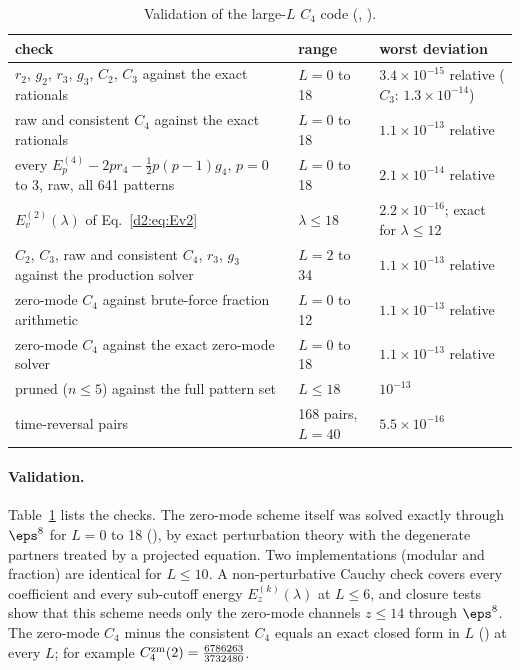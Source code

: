 \begin{table}[ht]
\centering\footnotesize\renewcommand{\arraystretch}{1.15}
\begin{tabular}{@{}p{8.6cm}p{2.2cm}p{3.7cm}@{}}
\toprule
check & range & worst deviation \\\midrule
$r_2$, $g_2$, $r_3$, $g_3$, $C_2$, $C_3$ against the exact rationals & $L=0$ to 18 & $3.4\times10^{-15}$ relative ($C_3$: $1.3\times10^{-14}$) \\
raw and consistent $C_4$ against the exact rationals & $L=0$ to 18 & $1.1\times10^{-13}$ relative \\
every $E_p^{(4)}-2pr_4-\frac12p(p-1)g_4$, $p=0$ to 3, raw, all 641 patterns & $L=0$ to 18 & $2.1\times10^{-14}$ relative \\
$E_v^{(2)}(\lambda)$ of Eq.~\eqref{d2:eq:Ev2} & $\lambda\le18$ & $2.2\times10^{-16}$; exact for $\lambda\le12$ \\
$C_2$, $C_3$, raw and consistent $C_4$, $r_3$, $g_3$ against the production solver & $L=2$ to 34 & $1.1\times10^{-13}$ relative \\
zero-mode $C_4$ against brute-force fraction arithmetic & $L=0$ to 12 & $1.1\times10^{-13}$ relative \\
zero-mode $C_4$ against the exact zero-mode solver & $L=0$ to 18 & $1.1\times10^{-13}$ relative \\
pruned ($n\le5$) against the full pattern set & $L\le18$ & $10^{-13}$ \\
time-reversal pairs & 168 pairs, $L=40$ & $5.5\times10^{-16}$ \\
\bottomrule
\end{tabular}
\caption{Validation of the large-$L$ $C_4$ code (, ).}
\label{d2:tab:c4valid}
\end{table}

\paragraph{Validation.} Table~\ref{d2:tab:c4valid} lists the checks. The zero-mode scheme itself was solved exactly through
$\eps^8$ for $L=0$ to 18 (), by exact perturbation theory with the degenerate partners treated by
a projected equation. Two implementations (modular and fraction) are identical for $L\le10$. A non-perturbative Cauchy
check covers every coefficient and every sub-cutoff energy $E_z^{(k)}(\lambda)$ at $L\le6$, and closure tests show that this scheme
needs only the zero-mode channels $z\le14$ through $\eps^8$. The zero-mode $C_4$ minus the consistent $C_4$ equals an exact
closed form in $L$ () at every $L$; for example
$C_4^{\rm zm}(2)=\frac{6786263}{3732480}$.


